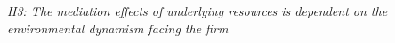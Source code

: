 \documentclass[review,fleqn]{elsarticle}\usepackage[]{graphicx}\usepackage[]{color}
\begin{document}
\emph{H3: The mediation effects of underlying resources is dependent on the environmental
dynamism facing the firm }










\end{document}
